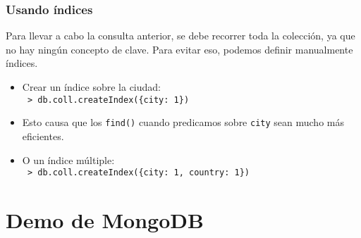 \begin{frame}
\frametitle{Usando índices}

Para llevar a cabo la consulta anterior, se debe recorrer toda la
colección, ya que no hay ningún concepto de clave. Para evitar eso,
podemos definir manualmente índices.
\pause

\begin{itemize}
\item	Crear un índice sobre la ciudad: \\
	\texttt{\footnotesize
		> db.coll.createIndex(\{city: 1\})
	}
	\pause

\item	Esto causa que los \texttt{find()} cuando predicamos sobre
	\texttt{city} sean mucho más eficientes.
	\pause

\item	O un índice múltiple: \\
	\texttt{\footnotesize
		> db.coll.createIndex(\{city: 1, country: 1\})
	}

\end{itemize}
\end{frame}

\section{Demo de MongoDB}
